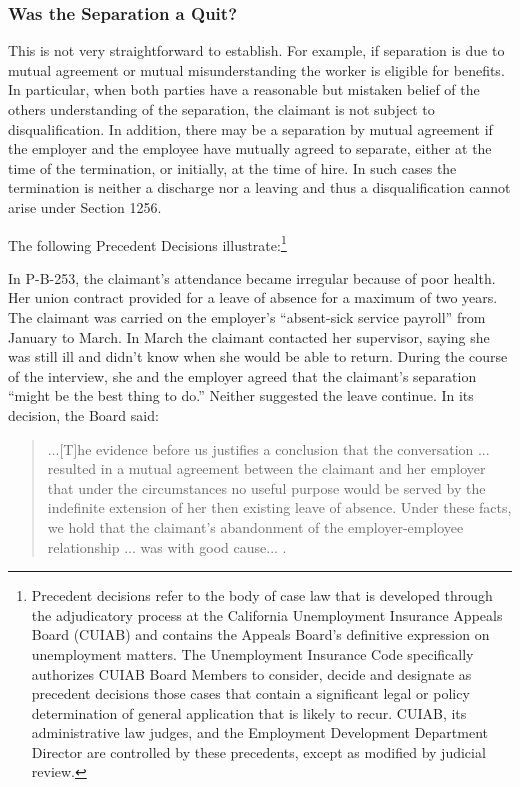 \documentclass[12pt]{article}
\newcommand{\1}{\mathbf{1}}
\begin{document}
\begin{appendix}
\begin{enumerate}
\end{enumerate}


\subsubsection{Was the Separation a Quit?}
\label{app:mutual_misunderstanding}
This is not very straightforward to establish. For example, if separation is due to mutual agreement or mutual misunderstanding the worker is eligible for benefits. In particular, when both parties have a reasonable but mistaken belief of the others understanding of the separation, the claimant is not subject to disqualification. In addition, there may be a separation by mutual agreement if the employer and the employee have mutually agreed to separate, either at the time of the termination, or initially, at the time of hire. In such cases the termination is neither a discharge nor a leaving and thus a disqualification cannot arise under Section 1256.

The following Precedent Decisions illustrate:\footnote{Precedent decisions refer to the body of case law that is developed through the adjudicatory process at the California Unemployment Insurance Appeals Board (CUIAB) and contains the Appeals Board's definitive expression on unemployment matters. The Unemployment Insurance Code specifically authorizes CUIAB Board Members to consider, decide and designate as precedent decisions those cases that contain a significant legal or policy determination of general application that is likely to recur. CUIAB, its administrative law judges, and the Employment Development Department Director are controlled by these precedents, except as modified by judicial review.}


In P-B-253, the claimant's attendance became irregular because of poor health. Her union contract provided for a leave of absence for a maximum of two years.
The claimant was carried on the employer's ``absent-sick service payroll'' from January to March. In March the claimant contacted her supervisor, saying she was still ill and didn't know when she would be able to return. During the course of the interview, she and the employer agreed that the claimant's separation ``might be the best thing to do.'' Neither suggested the leave continue. In its decision, the Board said:
\begin{quotation}
...[T]he evidence before us justifies a conclusion that the conversation ... resulted in a mutual agreement between the claimant and her employer that under the circumstances no useful purpose would be served by the indefinite extension of her then existing leave of absence. Under these facts, we hold that the claimant's abandonment of the employer-employee relationship ... was with good cause... .
\end{quotation}


\end{appendix}
\end{document}
